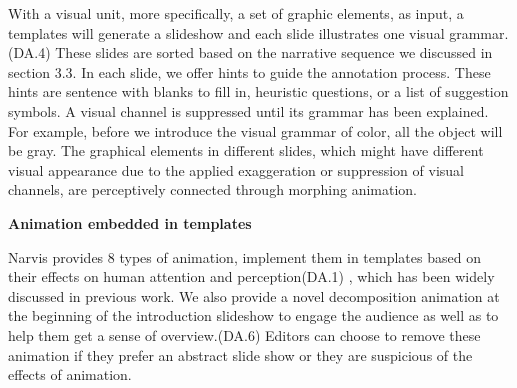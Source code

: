 With a visual unit, more specifically, a set of graphic elements, as input, a templates will generate a slideshow and each slide illustrates one visual grammar.(DA.4)  These slides are sorted based on the narrative sequence we discussed in section 3.3. In each slide, we offer hints to guide the annotation process. These hints are sentence with blanks to fill in, heuristic questions, or a list of suggestion symbols. A visual channel is suppressed until its grammar has been explained. For example, before we introduce the visual grammar of color, all the object will be gray.  The graphical elements in different slides, which might have different visual appearance due to the applied exaggeration or suppression of visual channels, are perceptively connected through morphing animation. 

\textbf{Animation embedded in templates }

Narvis provides 8 types of animation, implement them in templates based on their effects on human attention and perception(DA.1) , which has been widely discussed in previous work.\cite{robertson_effectiveness_2008, waldner_attractive_2014, heer_animated_2007}  We also provide a novel decomposition animation at the beginning of the introduction slideshow to engage the audience as well as to help them get a sense of overview.(DA.6) 
  Editors can choose to remove these animation if they prefer an abstract slide show or they are suspicious of the effects of animation. 


